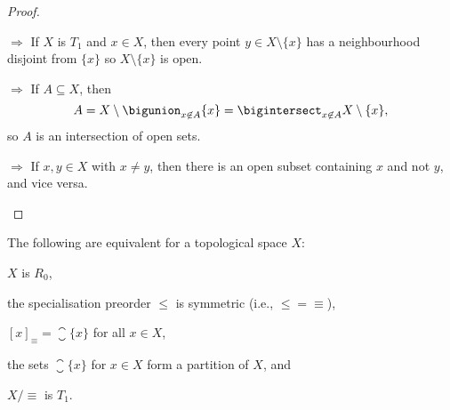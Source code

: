 \documentclass[article, a4paper, 11pt, oneside]{memoir}
\numberwithin{equation}{chapter}
\renewcommand{\implies}{\Rightarrow}
\begin{document}
\begin{proof}
\begin{proofsec}
    \item[\subcref{enum:T1-space} $\implies$ \subcref{enum:T1-singletons-closed}]
    If $X$ is $T_1$ and $x \in X$, then every point $y \in X \setminus \{x\}$ has a neighbourhood disjoint from $\{x\}$ so $X \setminus \{x\}$ is open.

    \item[\subcref{enum:T1-singletons-closed} $\implies$ \subcref{enum:T1-intersection-of-open-sets}]
    If $A \subseteq X$, then
    \begin{equation*}
        A   = X \setminus \bigunion_{x \not\in A} \{x\}
            = \bigintersect_{x \not\in A} X \setminus \{x\},
    \end{equation*}
    so $A$ is an intersection of open sets.

    \item[\subcref{enum:T1-intersection-of-open-sets} $\implies$ \subcref{enum:T1-space}]
    If $x,y \in X$ with $x \neq y$, then there is an open subset containing $x$ and not $y$, and vice versa.
\end{proofsec}
\end{proof}



\begin{proposition}
    The following are equivalent for a topological space $X$:
    \begin{enumprop}
        \item \label{enum:R0-space} $X$ is $R_0$,
        \item \label{enum:R0-specialisation-preorder-symmetric} the specialisation preorder $\leq$ is symmetric (i.e., ${\leq} = {\equiv}$),
        \item \label{enum:R0-closure-of-point} $[x]_\equiv = \closure{\{x\}}$ for all $x \in X$,
        \item \label{enum:R0-partition} the sets $\closure{\{x\}}$ for $x \in X$ form a partition of $X$, and
        \item \label{enum:R0-quotient-is-T1} $X/{\equiv}$ is $T_1$.
    \end{enumprop}
\end{proposition}
\end{document}
